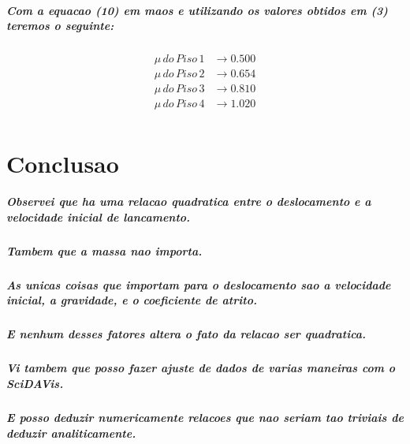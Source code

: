 \documentclass[12pt,twoside, a4paper, twocolumn]{article}
\begin{document}
\subparagraph*{Com a equacao (10) em maos e utilizando os valores obtidos em (3) teremos o seguinte:}

\begin{equation}
    \begin{aligned}
        \mu \, do \, Piso\, 1 & \rightarrow 0.500 \\
        \mu \, do \, Piso\, 2 & \rightarrow 0.654 \\
        \mu \, do \, Piso\, 3 & \rightarrow 0.810 \\
        \mu \, do \, Piso\, 4 & \rightarrow 1.020 \\
    \end{aligned}
\end{equation}

\section{Conclusao}

\subparagraph*{Observei que ha uma relacao quadratica entre o deslocamento e a velocidade inicial de lancamento.   }

\subparagraph*{Tambem que a massa nao importa.}

\subparagraph*{As unicas coisas que importam para o deslocamento sao a velocidade inicial, a gravidade, e o coeficiente de atrito.}

\subparagraph*{E nenhum desses fatores altera o fato da relacao ser quadratica.}

\subparagraph*{Vi tambem que posso fazer ajuste de dados de varias maneiras com o SciDAVis.}

\subparagraph*{E posso deduzir numericamente relacoes que nao seriam tao triviais de deduzir analiticamente.}
\end{document}

